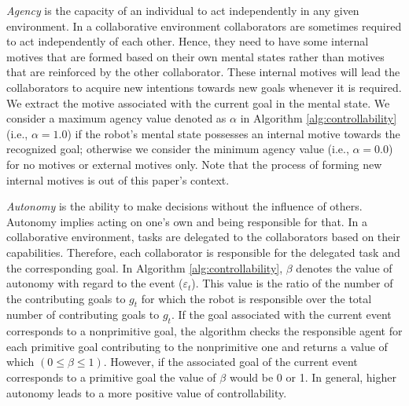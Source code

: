 \documentclass{aamas2016}
\begin{document}
\textit{Agency} is the capacity of an individual to act independently in any
given environment. In a collaborative environment collaborators are sometimes
required to act independently of each other. Hence, they need to have some
internal motives that are formed based on their own mental states rather than
motives that are reinforced by the other collaborator. These internal motives
will lead the collaborators to acquire new intentions towards new goals whenever
it is required. We extract the motive associated with the current goal in the
mental state. We consider a maximum agency value denoted as $\alpha$ in
Algorithm \ref{alg:controllability} (i.e., $\alpha=1.0$) if the robot's mental
state possesses an internal motive towards the recognized goal; otherwise we
consider the minimum agency value (i.e., $\alpha=0.0$) for no motives or
external motives only. Note that the process of forming new internal motives is
out of this paper's context.

% 

\textit{Autonomy} is the ability to make decisions without the influence of
others. Autonomy implies acting on one's own and being responsible for that. In
a collaborative environment, tasks are delegated to the collaborators based on
their capabilities. Therefore, each collaborator is responsible for the
delegated task and the corresponding goal. In Algorithm
\ref{alg:controllability}, $\beta$ denotes the value of autonomy with regard to
the event ($\varepsilon_t$). This value is the ratio of the number of the
contributing goals to $\mathit{g}_{t}$ for which the robot is responsible over
the total number of contributing goals to $\mathit{g}_{t}$. If the goal
associated with the current event corresponds to a nonprimitive goal, the
algorithm checks the responsible agent for each primitive goal contributing to
the nonprimitive one and returns a value of which $(0 \leq \beta \leq 1)$.
However, if the associated goal of the current event corresponds to a primitive
goal the value of $\beta$ would be 0 or 1. In general, higher autonomy leads to
a more positive value of controllability.
\end{document}
